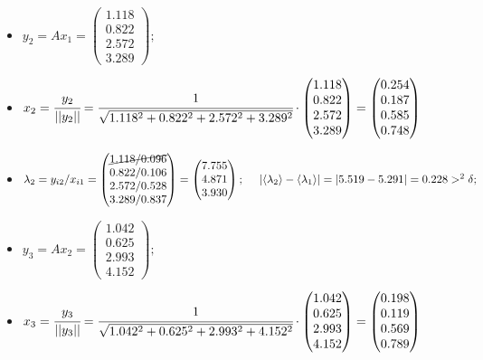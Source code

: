\begin{itemize}
    \item
    $y_2 = Ax_1 =
    \begin{pmatrix}
        1.118\\0.822\\2.572\\3.289
    \end{pmatrix};$

    \item
    $x_2 = \cfrac{y_2}{||y_2||} = \cfrac{1}{\sqrt{1.118^2+0.822^2+2.572^2+3.289^2}}\cdot
    \begin{pmatrix}
        1.118\\0.822\\2.572\\3.289
    \end{pmatrix} =
    \begin{pmatrix}
        0.254\\0.187\\0.585\\0.748
    \end{pmatrix}$

    \item
    $\lambda_2 = y_{i2} / x_{i1} =
    \begin{pmatrix}
        \cancel{1.118/0.096}\\
        0.822/0.106\\
        2.572/0.528\\
        3.289/0.837
    \end{pmatrix} =
    \begin{pmatrix}
        7.755 \\4.871 \\3.930
    \end{pmatrix};~~~~
    |\langle\lambda_2\rangle-\langle\lambda_1\rangle| = |5.519-5.291| = 0.228 >^2 \delta;$



    \item
    $y_3 = Ax_2 =
    \begin{pmatrix}
        1.042\\0.625\\2.993\\4.152
    \end{pmatrix};$

    \item
    $x_3 = \cfrac{y_3}{||y_3||} = \cfrac{1}{\sqrt{1.042^2+0.625^2+2.993^2+4.152^2}}\cdot
    \begin{pmatrix}
        1.042\\0.625\\2.993\\4.152
    \end{pmatrix} =
    \begin{pmatrix}
        0.198\\0.119\\0.569\\0.789
    \end{pmatrix}$


\end{itemize}
